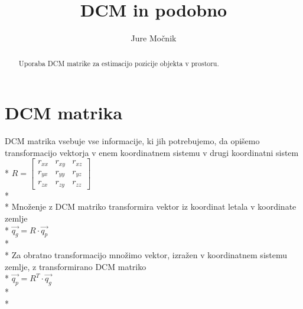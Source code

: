 \documentclass[]{article}
\title{DCM in podobno}
\author{Jure Močnik}
\begin{document}
\maketitle

\begin{abstract}
Uporaba DCM matrike za estimacijo pozicije objekta v prostoru.
\end{abstract}

\clearpage

\tableofcontents

\clearpage

\section{DCM matrika}

DCM matrika vsebuje vse informacije, ki jih potrebujemo, da opišemo transformacijo vektorja v enem koordinatnem sistemu v drugi koordinatni sistem\\*
$ R = \left[ \begin{array}{ccc}
r_{xx} & r_{xy} & r_{xz} \\ 
r_{yx} & r_{yy} & r_{yz} \\ 
r_{zx} & r_{zy} & r_{zz}
\end{array} \right]  $\\*\\*
Množenje z DCM matriko transformira vektor iz koordinat letala v koordinate zemlje\\*
$ \vec {q_{g}} = R \cdot \vec {q_{p}} $\\*\\*
Za obratno transformacijo množimo vektor, izražen v koordinatnem sistemu zemlje, z transformirano DCM matriko\\*
$ \vec {q_{p}} = R^{T} \cdot \vec {q_{g}} $\\*\\*
\end{document}
